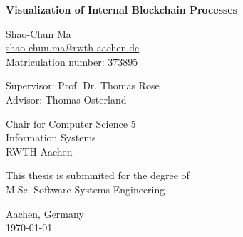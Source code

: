 \begin{titlepage}
    \begin{center}
        \vspace*{1cm}
        
        \huge
        \textbf{Visualization of Internal Blockchain Processes}
        
        \vspace{2cm}
        
        \large
        Shao-Chun Ma \\
        \href{mailto:shao-chun.ma@rwth-aachen.de}{shao-chun.ma@rwth-aachen.de} \\
        Matriculation number: 373895

        \vspace{1cm}

        Supervisor: Prof. Dr. Thomas Rose \\
        Advisor: Thomas Osterland \\

        \vspace{1.5cm}

        Chair for Computer Science 5 \\
        Information Systems \\
        RWTH Aachen
        
        \vfill
        
        This thesis is submmited for the degree of \\
        M.Sc. Software Systems Engineering
        
        \vspace{3cm}
        
        Aachen, Germany \\
        \today
        
    \end{center}
\end{titlepage}